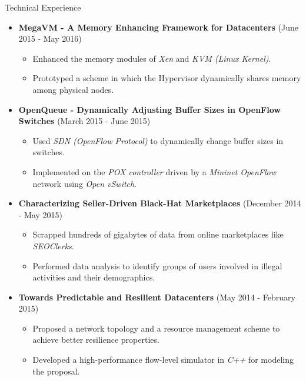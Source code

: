 \documentclass[]{Gohar_CV_Jobs}
\begin{document}
    \begin{cvsection}{Technical Experience}
        \begin{cvsubsection}{}{}{}
            \begin{itemize}
                \item \textbf{MegaVM - A Memory Enhancing Framework for Datacenters} \hfill(June 2015 - May 2016)
                    \begin{itemize}
                        \item Enhanced the memory modules of \textit{Xen} and \textit{KVM (Linux Kernel)}. 
                        \item Prototyped a scheme in which the Hypervisor dynamically shares memory among physical nodes.
                    \end{itemize}
                \item \textbf{OpenQueue - Dynamically Adjusting Buffer Sizes in OpenFlow Switches} \hfill(March 2015 - June 2015)
                    \begin{itemize}
                        \item Used \textit{SDN (OpenFlow  Protocol)} to dynamically change buffer sizes in switches. 
                        \item Implemented on the \textit{POX controller} driven by a \textit{Mininet OpenFlow} network using \textit{Open vSwitch}.
                    \end{itemize}
                \item \textbf{Characterizing Seller-Driven Black-Hat Marketplaces} \hfill(December 2014 - May 2015) 
                    \begin{itemize}
                        \item Scrapped hundreds of gigabytes of data from online marketplaces like \textit{SEOClerks}.
                        \item Performed data analysis to identify groups of users involved in illegal activities and their demographics.
                    \end{itemize}
                \item \textbf{Towards Predictable and Resilient Datacenters} \hfill(May 2014 - February 2015) 
                    \begin{itemize}
                        \item Proposed a network topology and a resource management scheme to achieve better resilience properties. 
                        \item Developed a high-performance flow-level simulator in \textit{C++} for modeling the proposal.
                    \end{itemize}
            \end{itemize}
        \end{cvsubsection}
    \end{cvsection}
    
\end{document}
